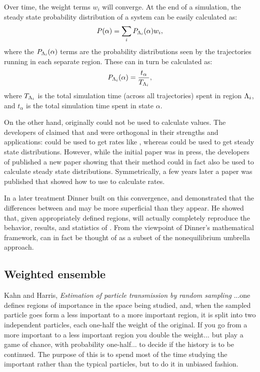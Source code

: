 Over time, the weight terms $w_i$ will converge\supercite{Dickson:2010gf}. At the end of a  simulation, the steady state probability distribution of a system can be easily calculated as:
\begin{equation*}
    P(\alpha) = \sum_{i} P_{\Lambda_{i}} (\alpha) w_i,
\end{equation*}
where the $P_{\Lambda_{i}} (\alpha)$ terms are the probability distributions seen by the trajectories running in each separate region. These can in turn be calculated as:
\begin{equation*}
    P_{\Lambda_{i}} (\alpha) = \frac{t_{\alpha}}{T_{\Lambda_{i}}},
\end{equation*}
where $T_{\Lambda_{i}}$ is the total simulation time (across all trajectories) spent in region $\Lambda_{i}$, and $t_{\alpha}$ is the total simulation time spent in state $\alpha$.

On the other hand,  originally could not be used to calculate  values. The developers of  claimed that  and  were orthogonal in their strengths and applications:  could be used to get rates like , whereas  could be used to get steady state distributions. However, while the initial  paper was in press, the developers of  published a new paper showing that their method could in fact also be used to calculate steady state distributions\supercite{Valeriani:2007hv}. Symmetrically, a few years later a paper was published that showed how to use  to calculate rates\supercite{Dickson:2009fua}.


In a later treatment\supercite{Dickson:2010gf} Dinner built on this convergence, and demonstrated that the differences between  and  may be more superficial than they appear. He showed that, given appropriately defined regions,  will actually completely reproduce the behavior, results, and statistics of . From the viewpoint of Dinner's mathematical framework,  can in fact be thought of as a subset of the nonequilibrium umbrella approach.

\subsection{Weighted ensemble}

\begin{chapquote}{Kahn and Harris, \textit{Estimation of particle transmission by random sampling}\supercite{Kahn:1951es}}
...one defines regions of importance in the space being studied, and, when the sampled particle goes form a less important to a more important region, it is split into two independent particles, each one-half the weight of the original. If you go from a more important to a less important region you double the weight... but play a game of chance, with probability one-half... to decide if the history is to be continued. The purpose of this is to spend most of the time studying the important rather than the typical particles, but to do it in unbiased fashion.
\end{chapquote}

